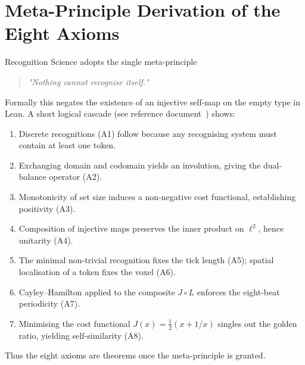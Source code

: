 \documentclass[11pt]{article}
\numberwithin{equation}{section}
\theoremstyle{remark}
\begin{document}
\section{Meta-Principle Derivation of the Eight Axioms}\label{app:meta}
Recognition Science adopts the single meta-principle
\begin{quote}
\emph{"Nothing cannot recognise itself."}
\end{quote}
Formally this negates the existence of an injective self-map on the empty type in Lean.  A short logical cascade (see reference document~\cite{RSReference2025}) shows:
\begin{enumerate}
  \item Discrete recognitions (A1) follow because any recognising system must contain at least one token.
  \item Exchanging domain and codomain yields an involution, giving the dual-balance operator (A2).
  \item Monotonicity of set size induces a non-negative cost functional, establishing positivity (A3).
  \item Composition of injective maps preserves the inner product on $\ell^2$, hence unitarity (A4).
  \item The minimal non-trivial recognition fixes the tick length (A5); spatial localisation of a token fixes the voxel (A6).
  \item Cayley–Hamilton applied to the composite $J\circ L$ enforces the eight-beat periodicity (A7).
  \item Minimising the cost functional $J(x)=\tfrac12(x+1/x)$ singles out the golden ratio, yielding self-similarity (A8).
\end{enumerate}
Thus the eight axioms are theorems once the meta-principle is granted.
\end{document}
